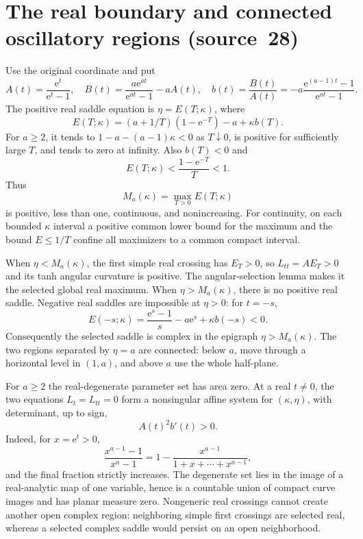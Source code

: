 \documentclass[11pt,a4paper]{article}
\numberwithin{equation}{section}
\theoremstyle{definition}
\theoremstyle{plain}
\newcommand{\ee}{\mathrm e}
\newcommand{\src}[1]{\texorpdfstring{\textup{(source~#1)}}{(source #1)}}
\begin{document}
\section{The real boundary and connected oscillatory regions \src{28}}\label{pte:sec:ga-real}
Use the original coordinate and put
\[
 A(t)=\frac{\ee^t}{\ee^t-1},\quad
 B(t)=\frac{a\ee^{at}}{\ee^{at}-1}-aA(t),\quad
 b(t)=\frac{B(t)}{A(t)}=-a\frac{\ee^{(a-1)t}-1}{\ee^{at}-1}.
\]
The positive real saddle equation is $\eta=E(T;\kappa)$, where
\begin{equation}\label{pte:ga:realmap}
 E(T;\kappa)=(a+1/T)(1-\ee^{-T})-a+\kappa b(T).
\end{equation}
For $a\ge2$, it tends to $1-a-(a-1)\kappa<0$ as $T\downarrow0$, is positive for sufficiently large $T$, and tends to zero at infinity. Also $b(T)<0$ and
\[
 E(T;\kappa)<\frac{1-\ee^{-T}}T<1.
\]
Thus
\begin{equation}\label{pte:ga:realboundary}
 M_a(\kappa)=\max_{T>0}E(T;\kappa)
\end{equation}
is positive, less than one, continuous, and nonincreasing. For continuity, on each bounded $\kappa$ interval a positive common lower bound for the maximum and the bound $E\le1/T$ confine all maximizers to a common compact interval.

When $\eta<M_a(\kappa)$, the first simple real crossing has $E_T>0$, so $L_{tt}=AE_T>0$ and its tanh angular curvature is positive. The angular-selection lemma makes it the selected global real maximum. When $\eta>M_a(\kappa)$, there is no positive real saddle. Negative real saddles are impossible at $\eta>0$: for $t=-s$,
\[
 E(-s;\kappa)=\frac{\ee^s-1}s-a\ee^s+\kappa b(-s)<0.
\]
Consequently the selected saddle is complex in the epigraph $\eta>M_a(\kappa)$. The two regions separated by $\eta=a$ are connected: below $a$, move through a horizontal level in $(1,a)$, and above $a$ use the whole half-plane.

For $a\ge2$ the real-degenerate parameter set has area zero. At a real $t\ne0$, the two equations $L_t=L_{tt}=0$ form a nonsingular affine system for $(\kappa,\eta)$, with determinant, up to sign,
\begin{equation}\label{pte:ga:determinant}
 A(t)^2b'(t)>0.
\end{equation}
Indeed, for $x=\ee^t>0$,
\[
 \frac{x^{a-1}-1}{x^a-1}
 =1-\frac{x^{a-1}}{1+x+\cdots+x^{a-1}},
\]
and the final fraction strictly increases. The degenerate set lies in the image of a real-analytic map of one variable, hence is a countable union of compact curve images and has planar measure zero. Nongeneric real crossings cannot create another open complex region: neighboring simple first crossings are selected real, whereas a selected complex saddle would persist on an open neighborhood.
\end{document}
